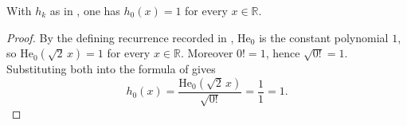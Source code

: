 \begin{lemma}
With $h_k$ as in , one has $h_0(x) = 1$ for every
$x \in \mathbb{R}$.
\end{lemma}
\begin{proof}
By the defining recurrence recorded in , $\mathrm{He}_0$ is the
constant polynomial $1$, so $\mathrm{He}_0(\sqrt2\,x) = 1$ for every
$x \in \mathbb{R}$.  Moreover $0! = 1$, hence $\sqrt{0!} = 1$.  Substituting both
into the formula of  gives
\[
  h_0(x) = \frac{\mathrm{He}_0(\sqrt2\,x)}{\sqrt{0!}} = \frac{1}{1} = 1 .
\]
\end{proof}
